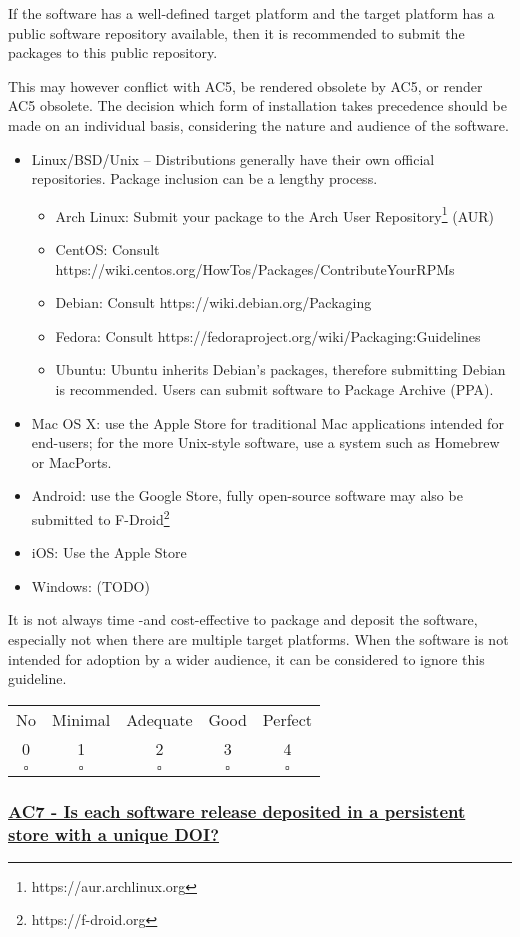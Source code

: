 \documentclass[a4paper,11pt]{article}
\newcommand{\criterion}[2]{\subsubsection*{\underline{#1 - #2}}\label{id:#1}}
\newcommand\CheckTable{%
  \begin{tabular}{ccccc}
    No & Minimal & Adequate & Good & Perfect \\
    0 & 1 & 2 & 3 & 4 \\
    \hline
    $\square$ & $\square$ & $\square$ & $\square$ & $\square$ \\
  \end{tabular}%
}
\begin{document}
If the software has a well-defined target platform and the target platform has
a public software repository available, then it is recommended to submit the
packages to this public repository.

This may however conflict with AC5, be rendered obsolete by AC5, or render AC5
obsolete. The decision which form of installation takes precedence should be
made on an individual basis, considering the nature and audience of the
software.

\begin{itemize}
    \item Linux/BSD/Unix -- Distributions generally have their own official repositories. Package inclusion can be a lengthy process.
    \begin{itemize}
        \item Arch Linux: Submit your package to the Arch User Repository\footnote{https://aur.archlinux.org} (AUR)
		\item CentOS: Consult https://wiki.centos.org/HowTos/Packages/ContributeYourRPMs
        \item Debian: Consult https://wiki.debian.org/Packaging
        \item Fedora: Consult https://fedoraproject.org/wiki/Packaging:Guidelines
        \item Ubuntu: Ubuntu inherits Debian's packages, therefore submitting Debian is recommended. Users can submit software  to Package Archive (PPA).
    \end{itemize}
    \item Mac OS X: use the Apple Store for traditional Mac applications intended for end-users; for the more Unix-style
        software, use a system such as Homebrew or MacPorts.
    \item Android: use the Google Store, fully open-source software may also be submitted to F-Droid\footnote{https://f-droid.org}
    \item iOS: Use the Apple Store
    \item Windows: (TODO) 
\end{itemize}

It is not always time -and cost-effective to package and deposit the software,
especially not when there are multiple target platforms. When the software is
not intended for adoption by a wider audience, it can be considered to ignore
this guideline.

\CheckTable

\newcommand{\acSevenID}{AC7}
\newcommand{\acSevenText}{Is each software release deposited in a persistent store with a unique DOI?}
\criterion{\acSevenID}{\acSevenText}
\end{document}
